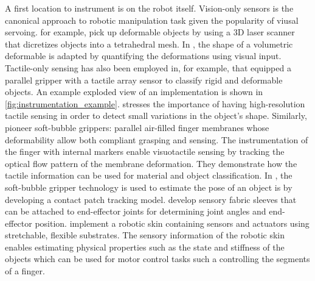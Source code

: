 \documentclass[\home/main.tex]{subfiles}
\begin{document}

A first location to instrument is on the robot itself. 
Vision-only sensors is the canonical approach to robotic manipulation task given the popularity of viusal servoing. \textcite{Lin2015} for example, pick up deformable objects by using a 3D laser scanner that dicretizes objects into a tetrahedral mesh. In \autocite{Navarro-Alarcon2016}, the shape of a volumetric deformable is adapted by quantifying the deformations using visual input.
Tactile-only sensing has also been employed in, for example, \autocite{Drimus2014} that equipped a parallel gripper with a tactile array sensor to classify rigid and deformable objects. An example exploded view of an implementation is shown in \cref{fig:instrumentation_example}. \textcite{Kappassov2015} stresses the importance of having high-resolution tactile sensing in order to detect small variations in the object's shape. Similarly, \textcite{Naveen2020soft} pioneer soft-bubble grippers: parallel air-filled finger membranes whose deformability allow both compliant grasping and sensing. The instrumentation of the finger with internal markers enable visuotactile sensing by tracking the optical flow pattern of the membrane deformation. They demonstrate how the tactile information can be used for material and object classification. In \autocite{Naveen2020fast}, the soft-bubble gripper technology is used to estimate the pose of an object is by developing a contact patch tracking model. \Textcite{Yuen2017} develop sensory fabric sleeves that can be attached to end-effector joints for determining joint angles and end-effector position. \autocite{Case2019, case2018state} implement a robotic skin containing sensors and actuators using stretchable, flexible substrates. The sensory information of the robotic skin enables estimating physical properties such as the state and stiffness of the objects which can be used for motor control tasks such a controlling the segments of a finger.
\end{document}
